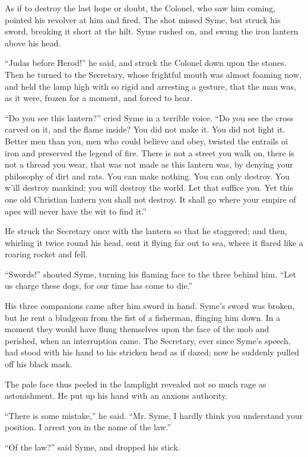 \documentclass{book}
\begin{document}
As if to destroy the last hope or doubt, the Colonel, who saw him coming, pointed his revolver at him and fired. The shot missed Syme, but struck his sword, breaking it short at the hilt. Syme rushed on, and swung the iron lantern above his head.

“Judas before Herod!” he said, and struck the Colonel down upon the stones. Then he turned to the Secretary, whose frightful mouth was almost foaming now, and held the lamp high with so rigid and arresting a gesture, that the man was, as it were, frozen for a moment, and forced to hear.

“Do you see this lantern?” cried Syme in a terrible voice. “Do you see the cross carved on it, and the flame inside? You did not make it. You did not light it. Better men than you, men who could believe and obey, twisted the entrails oi iron and preserved the legend of fire. There is not a street you walk on, there is not a thread you wear, that was not made as this lantern was, by denying your philosophy of dirt and rats. You can make nothing. You can only destroy. You w’ill destroy mankind; you will destroy the world. Let that suffice you. Yet this one old Christian lantern you shall not destroy. It shall go where your empire of apes will never have the wit to find it.”

He struck the Secretary once with the lantern so that he staggered; and then, whirling it twice round his head, sent it flying far out to sea, where it flared like a roaring rocket and fell.

“Swords!” shouted Syme, turning his flaming face to the three behind him. “Let us charge these dogs, for our time has come to die.”

His three companions came after him sword in hand. Syme’s sword was broken, but he rent a bludgeon from the fist of a fisherman, flinging him down. In a moment they would have flung themselves upon the face of the mob and perished, when an interruption came. The Secretary, ever since Syme’s speech, had stood with his hand to his stricken head as if dazed; now he suddenly pulled off his black mask.

The pale face thus peeled in the lamplight revealed not so much rage as astonishment. He put up his hand with an anxious authority.

“There is some mistake,” he said. “Mr. Syme, I hardly think you understand your position. I arrest you in the name of the law.”

“Of the law?” said Syme, and dropped his stick.
\end{document}
